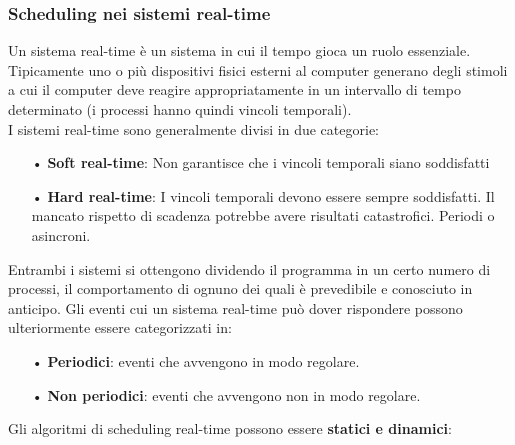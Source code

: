 \documentclass{article}
\begin{document}
\subsubsection{Scheduling nei sistemi real-time}
Un sistema real-time è un sistema in cui il tempo gioca un ruolo essenziale.
\\Tipicamente uno o più dispositivi fisici esterni al computer generano degli stimoli a cui il computer deve reagire appropriatamente in un intervallo di tempo
determinato (i processi hanno quindi vincoli temporali).
\\I sistemi real-time sono generalmente divisi in due categorie:
\begin{enumerate}
   \item[•] \textbf{Soft real-time}: Non garantisce che i vincoli temporali siano soddisfatti
   \item[•] \textbf{Hard real-time}: I vincoli temporali devono essere sempre soddisfatti. Il mancato rispetto di scadenza potrebbe avere risultati catastrofici. Periodi o asincroni.
\end{enumerate}
Entrambi i sistemi si ottengono dividendo il programma in un certo numero
di processi, il comportamento di ognuno dei quali è prevedibile e conosciuto
in anticipo. Gli eventi cui un sistema real-time può dover rispondere possono
ulteriormente essere categorizzati in:
\begin{enumerate}
   \item[•] \textbf{Periodici}: eventi che avvengono in modo regolare.
   \item[•] \textbf{Non periodici}: eventi che avvengono non in modo regolare.
\end{enumerate}
Gli algoritmi di scheduling real-time possono essere \textbf{statici e dinamici}:
\end{document}
